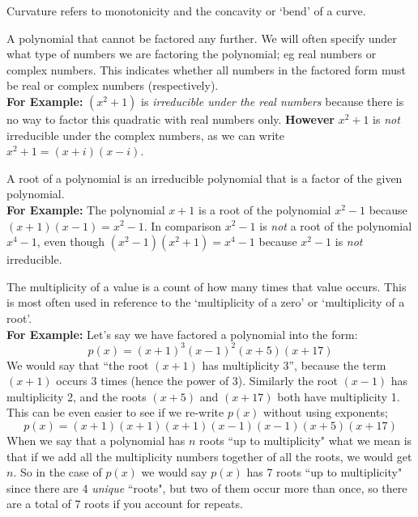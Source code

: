 \documentclass{ximeraXloud}
\begin{document}
\begin{definition}[Curvature]
    Curvature refers to monotonicity and the concavity or `bend' of a curve.
\end{definition} 

\begin{definition}
    A polynomial that cannot be factored any further. We will often specify under what type of numbers we are factoring the polynomial; eg real numbers or complex numbers. This indicates whether all numbers in the factored form must be real or complex numbers (respectively).\\
    \textbf{For Example:} $(x^2+1)$ is \textit{irreducible under the real numbers} because there is no way to factor this quadratic with real numbers only. \textbf{However} $x^2+1$ is \textit{not} irreducible under the complex numbers, as we can write $x^2+1 = (x+i)(x-i)$.
\end{definition} 

\begin{definition}
    A root of a polynomial is an irreducible polynomial that is a factor of the given polynomial.\\
    \textbf{For Example:} The polynomial $x + 1$ is a root of the polynomial $x^2 - 1$ because $(x+1)(x-1) = x^2 -1$. In comparison $x^2-1$ is \textit{not} a root of the polynomial $x^4-1$, even though $(x^2-1)(x^2+1) = x^4-1$ because $x^2-1$ is \textit{not} irreducible.
\end{definition}

\begin{definition}
    The multiplicity of a value is a count of how many times that value occurs. This is most often used in reference to the `multiplicity of a zero' or `multiplicity of a root'. \\
    \textbf{For Example:} Let's say we have factored a polynomial into the form:
    \[
        p(x) = (x+1)^3(x-1)^2(x+5)(x+17)
    \]
    We would say that ``the root $(x+1)$ has multiplicity 3'', because the term $(x+1)$ occurs 3 times (hence the power of 3). Similarly the root $(x-1)$ has multiplicity 2, and the roots $(x+5)$ and $(x+17)$ both have multiplicity 1. This can be even easier to see if we re-write $p(x)$ without using exponents;
    \[
        p(x) = (x+1)(x+1)(x+1)(x-1)(x-1)(x+5)(x+17)
    \]
    When we say that a polynomial has $n$ roots ``up to multiplicity" what we mean is that if we add all the multiplicity numbers together of all the roots, we would get $n$. So in the case of $p(x)$ we would say $p(x)$ has 7 roots ``up to multiplicity" since there are 4 \textit{unique} ``roots", but two of them occur more than once, so there are a total of 7 roots if you account for repeats.
\end{definition}
\end{document}
